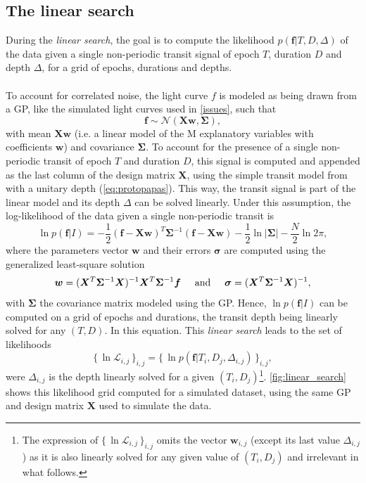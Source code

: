 \documentclass[modern]{aastex631}
\newcommand{\set}[1]{\{\,#1\,\}}
\begin{document}
\subsection{The linear search}\label{linear_search}

During the \textit{linear search}, the goal is to compute the likelihood $p(\bm{f} \vert T , D, \Delta)$ of the data given a single non-periodic transit signal of epoch $T$, duration $D$ and depth $\Delta$, for a grid of epochs, durations and depths.
\\\\
To account for correlated noise, the light curve $f$ is modeled as being drawn from a GP, like the simulated light curves used in \autoref{issues}, such that
\begin{equation*}
    \bm{f} \sim \mathcal{N}(\bm{X w}, \bm{\Sigma}),
\end{equation*}
with mean $\bm{Xw}$ (i.e. a linear model of the M explanatory variables with coefficients $\bm{w}$) and covariance $\bm{\Sigma}$. To account for the presence of a single non-periodic transit of epoch $T$ and duration $D$, this signal is computed and appended as the last column of the design matrix $\bm{X}$, using the simple transit model from \cite{protopapas} with a unitary depth (\autoref{eq:protopapas}). This way, the transit signal is part of the linear model and its depth $\Delta$ can be solved linearly. Under this assumption, the log-likelihood of the data given a single non-periodic transit is \citep{Rasmussen2005}
\begin{equation} \label{eq:linear_search_ll}
    \ln p(\bm{f} \vert I) = -\frac{1}{2}(\bm{f}-\bm{Xw})^T\bm{\Sigma}^{-1}(\bm{f}-\bm{Xw}) -  \frac{1}{2}\ln\vert\bm{\Sigma}\vert - \frac{N}{2}\ln 2\pi,
\end{equation}
where the parameters vector $\bm{w}$ and their errors $\bm{\sigma}$ are computed using the generalized least-square solution
\begin{equation}\label{eq:ls}
    \bm{w} = (\bm{X}^T\bm{\Sigma}^{-1}\bm{X})^{-1}\bm{X}^T\bm{\Sigma}^{-1}\bm{f} \hspace{0.5cm} \text{and} \hspace{0.5cm} \bm{\sigma} = (\bm{X}^T\bm{\Sigma}^{-1}\bm{X})^{-1},
\end{equation} 
with $\bm{\Sigma}$ the covariance matrix modeled using the GP. Hence, $\ln p(\bm{f} \vert I)$ can be computed on a grid of epochs and durations, the transit depth being linearly solved for any $(T, D)$. In this equation. This \textit{linear search} leads to the set of likelihoods
\begin{equation*}
    \set{\ln\mathcal{L}_{i,j}}_{i, j} = \set{\ln p(\bm{f} \vert T_i ,D_j, \Delta_{i,j})}_{i, j},
\end{equation*}
were $\Delta_{i,j}$ is the depth linearly solved for a given $(T_i, D_j)$\footnote{The expression of $\set{\ln\mathcal{L}_{i,j}}_{i, j}$ omits the vector $\bm{w}_{i,j}$ (except its last value $\Delta_{i,j}$) as it is also linearly solved for any given value of $(T_i, D_j)$ and irrelevant in what follows.}. \autoref{fig:linear_search} shows this likelihood grid computed for a simulated dataset, using the same GP  and design matrix $\bm{X}$ used to simulate the data.
\end{document}
